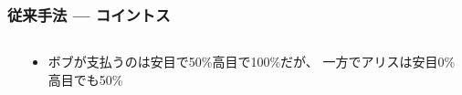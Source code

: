 \begin{frame}
  \frametitle{従来手法 --- コイントス}

  \begin{columns}
    \begin{column}{0.6\textwidth}

      \pause
    \end{column}
    \begin{column}{0.4\textwidth}
      \begin{itemize}
        \item ボブが支払うのは安目で50\%高目で100\%だが、
        一方でアリスは安目0\%高目でも50\%
      \end{itemize}
    \end{column}
  \end{columns}
\end{frame}

